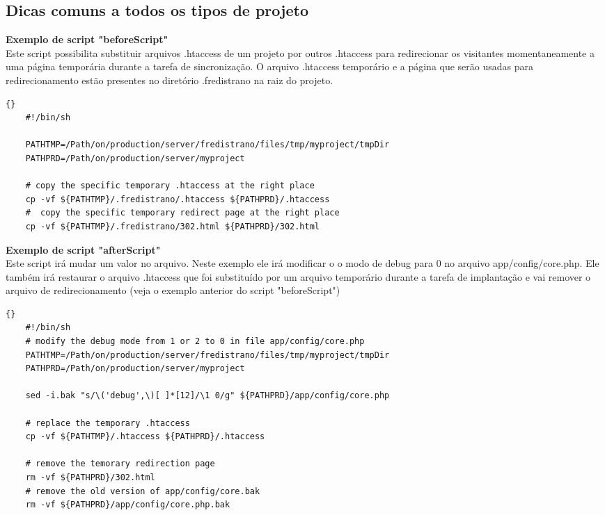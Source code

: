 \documentclass[12pt,a4paper]{report}
\begin{document}
\subsection{Dicas comuns a todos os tipos de projeto} %
\begin{list}{-}{}
\item \textbf{Exemplo de script "beforeScript"}\\
Este script possibilita substituir arquivos .htaccess de um projeto por outros .htaccess para redirecionar os visitantes momentaneamente a uma página temporária durante a tarefa de sincronização.  O arquivo .htaccess temporário e a página que serão usadas para redirecionamento estão presentes no diretório .fredistrano na raiz do projeto.

	\lstset{language=bash}
	\lstset{breaklines=true}
	\lstset{tabsize=1}
	\begin{lstlisting}[frame=tb]{}
	#!/bin/sh

	PATHTMP=/Path/on/production/server/fredistrano/files/tmp/myproject/tmpDir
	PATHPRD=/Path/on/production/server/myproject

	# copy the specific temporary .htaccess at the right place 
	cp -vf ${PATHTMP}/.fredistrano/.htaccess ${PATHPRD}/.htaccess
	#  copy the specific temporary redirect page at the right place 
	cp -vf ${PATHTMP}/.fredistrano/302.html ${PATHPRD}/302.html
	\end{lstlisting}

\item \textbf{Exemplo de script "afterScript"}\\
Este script irá mudar um valor no arquivo.  Neste exemplo ele irá modificar o o modo de debug para 0 no arquivo app/config/core.php.  Ele também irá restaurar o arquivo .htaccess que foi substituído por um arquivo temporário durante a tarefa de implantação e vai remover o arquivo de redirecionamento (veja o exemplo anterior do script "beforeScript")
	\lstset{language=bash}
	\lstset{breaklines=true}
	\lstset{tabsize=1}
	\begin{lstlisting}[frame=tb]{}
	#!/bin/sh
	# modify the debug mode from 1 or 2 to 0 in file app/config/core.php
	PATHTMP=/Path/on/production/server/fredistrano/files/tmp/myproject/tmpDir
	PATHPRD=/Path/on/production/server/myproject

	sed -i.bak "s/\('debug',\)[ ]*[12]/\1 0/g" ${PATHPRD}/app/config/core.php

	# replace the temporary .htaccess 
	cp -vf ${PATHTMP}/.htaccess ${PATHPRD}/.htaccess

	# remove the temorary redirection page 
	rm -vf ${PATHPRD}/302.html
	# remove the old version of app/config/core.bak
	rm -vf ${PATHPRD}/app/config/core.php.bak
	\end{lstlisting}


\end{list}
\end{document}
